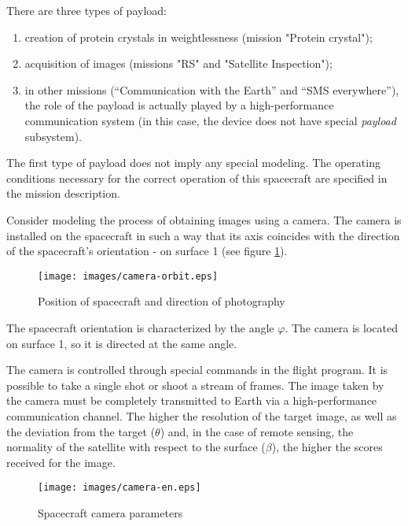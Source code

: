 \documentclass[12pt,a4paper]{article}
\begin{document}
There are three types of payload:

\begin{enumerate}
\item creation of protein crystals in weightlessness (mission "Protein crystal");
\item acquisition of images (missions "RS" and "Satellite Inspection");
\item in other missions (“Communication with the Earth” and “SMS everywhere”), the role of the payload is actually played by a high-performance communication system (in this case, the device does not have
   special \emph{payload} subsystem).
\end{enumerate}

The first type of payload does not imply any special modeling. The operating conditions necessary for the correct operation of this spacecraft are specified in the mission description.

Consider modeling the process of obtaining images using a camera. The camera is installed on the spacecraft in such a way that its axis coincides with the direction of the spacecraft's orientation - on surface 1 (see figure \ref{Pic:Camera-Orbit}).

\begin{figure}[tbh]
  \begin{center}
    \texttt{[image: images/camera-orbit.eps]}
    \caption{Position of spacecraft and direction of photography}
    \label{Pic:Camera-Orbit}
  \end{center}
\end{figure}

The spacecraft orientation is characterized by the angle $\varphi$. The camera is located on surface 1, so it is directed at the same angle.

The camera is controlled through special commands in the flight program. It is possible to take a single shot or shoot a stream of frames. The image taken by the camera must be completely transmitted to Earth via a high-performance communication channel. The higher the resolution of the target image, as well as the deviation from the target ($\theta$) and, in the case of remote sensing, the normality of the satellite with respect to the surface ($\beta$), the higher the scores received for the image.

\begin{figure}[tbh]
  \begin{center}
    \texttt{[image: images/camera-en.eps]}
    \caption{Spacecraft camera parameters}
    \label{Pic:Camera}
  \end{center}
\end{figure}
\end{document}
